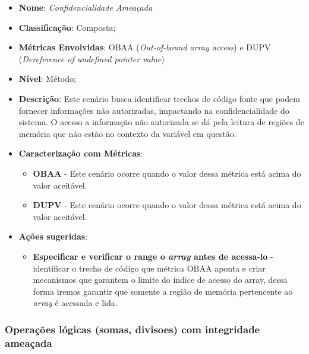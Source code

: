 \begin{itemize}
\item \textbf{Nome}: \emph{Confidencialidade Ameaçada}
\item \textbf{Classificação}: Composta;
\item \textbf{Métricas Envolvidas}: OBAA (\emph{Out-of-bound array access}) e DUPV (\emph{Dereference of undefined pointer value}) 
\item \textbf{Nível}: Método;
\item \textbf{Descrição}: Este cenário busca identificar trechos de código fonte que podem fornecer informações não autorizadas, impactando na confidencialidade do sistema. O acesso a informação não autorizada se dá pela leitura de regiões de memória que não estão no contexto da variável em questão.
\item \textbf{Caracterização com Métricas}: 
	\begin{itemize}
	\item \textbf{OBAA} - Este cenário ocorre quando o valor dessa métrica está acima do valor aceitável.
	\item \textbf{DUPV} - Este cenário ocorre quando o valor dessa métrica está acima do valor aceitável.
	\end{itemize}
\item \textbf{Ações sugeridas}: 
	\begin{itemize}
	\item \textbf{Especificar e verificar o range o \emph{array} antes de acessa-lo} - identificar o trecho de código que métrica OBAA aponta e criar mecanismos que garantem o limite do índice de acesso do array, dessa forma iremos garantir que somente a região de memória pertencente ao \emph{array} é acessada e lida.  
	 
	\end{itemize}
\end{itemize}



%
%
%



\subsubsection{Operações lógicas (somas, divisoes) com integridade ameaçada}

